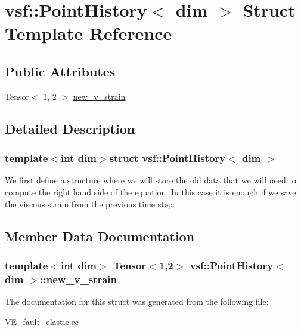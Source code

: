 \hypertarget{structvsf_1_1PointHistory}{\section{vsf\-:\-:Point\-History$<$ dim $>$ Struct Template Reference}
\label{structvsf_1_1PointHistory}
}
\subsection*{Public Attributes}
\begin{DoxyCompactItemize}
\item 
Tensor$<$ 1, 2 $>$ \hyperlink{structvsf_1_1PointHistory_a24aabd1a3f1b17bbd0a69d5f630037d2}{new\-\_\-v\-\_\-strain}
\end{DoxyCompactItemize}


\subsection{Detailed Description}
\subsubsection*{template$<$int dim$>$struct vsf\-::\-Point\-History$<$ dim $>$}

We first define a structure where we will store the old data that we will need to compute the right hand side of the equation. In this case it is enough if we save the viscous strain from the previous time step. 

\subsection{Member Data Documentation}
\hypertarget{structvsf_1_1PointHistory_a24aabd1a3f1b17bbd0a69d5f630037d2}{
\subsubsection[{new\-\_\-v\-\_\-strain}]{\setlength{\rightskip}{0pt plus 5cm}template$<$int dim$>$ Tensor$<$1,2$>$ {\bf vsf\-::\-Point\-History}$<$ dim $>$\-::new\-\_\-v\-\_\-strain}}\label{structvsf_1_1PointHistory_a24aabd1a3f1b17bbd0a69d5f630037d2}


The documentation for this struct was generated from the following file\-:\begin{DoxyCompactItemize}
\item 
\hyperlink{VE__fault__elastic_8cc}{V\-E\-\_\-fault\-\_\-elastic.\-cc}\end{DoxyCompactItemize}
